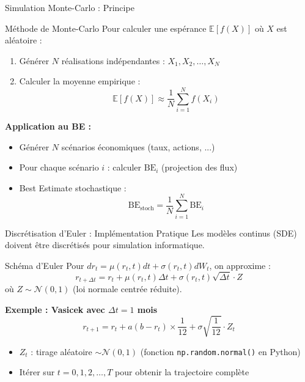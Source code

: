 \documentclass[10pt,aspectratio=169,xcolor={dvipsnames}]{beamer}
\newcommand{\BE}{\text{BE}}
\newcommand{\E}{\mathbb{E}}
\begin{document}
\begin{frame}{Simulation Monte-Carlo : Principe}
\begin{block}{Méthode de Monte-Carlo}
Pour calculer une espérance $\E[f(X)]$ où $X$ est aléatoire :
\begin{enumerate}
    \item Générer $N$ réalisations indépendantes : $X_1, X_2, \ldots, X_N$
    \item Calculer la moyenne empirique :
    \[
    \E[f(X)] \approx \frac{1}{N}\sum_{i=1}^{N} f(X_i)
    \]
\end{enumerate}
\end{block}

\vspace{0.3cm}
\textbf{Application au BE :}
\begin{itemize}
    \item Générer $N$ scénarios économiques (taux, actions, ...)
    \item Pour chaque scénario $i$ : calculer $\BE_i$ (projection des flux)
    \item Best Estimate stochastique :
    \[
    \BE_{\text{stoch}} = \frac{1}{N}\sum_{i=1}^{N} \BE_i
    \]
\end{itemize}
\end{frame}

\begin{frame}{Discrétisation d'Euler : Implémentation Pratique}
Les modèles continus (SDE) doivent être discrétisés pour simulation informatique.
\begin{block}{Schéma d'Euler}
Pour $dr_t = \mu(r_t, t)dt + \sigma(r_t, t)dW_t$, on approxime :
\[
r_{t+\Delta t} = r_t + \mu(r_t, t)\Delta t + \sigma(r_t, t)\sqrt{\Delta t} \cdot Z
\]
où $Z \sim \mathcal{N}(0,1)$ (loi normale centrée réduite).
\end{block}

\vspace{0.3cm}
\textbf{Exemple : Vasicek avec $\Delta t = 1$ mois}
\[
r_{t+1} = r_t + a(b - r_t) \times \frac{1}{12} + \sigma \sqrt{\frac{1}{12}} \cdot Z_t
\]

\begin{itemize}
    \item $Z_t$ : tirage aléatoire $\sim \mathcal{N}(0,1)$ (fonction \texttt{np.random.normal()} en Python)
    \item Itérer sur $t = 0, 1, 2, \ldots, T$ pour obtenir la trajectoire complète
\end{itemize}
\end{frame}
\end{document}
